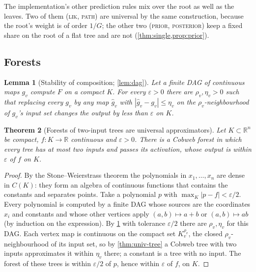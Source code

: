\documentclass[11pt]{article}
\newtheorem{theorem}{Theorem}
\newtheorem{lemma}[theorem]{Lemma}
\theoremstyle{definition}
\theoremstyle{remark}
\newcommand{\R}{\mathbb{R}}
\begin{document}
The implementation's other prediction rules mix over the root as well as the leaves.
Two of them (\textsc{lik}, \textsc{path}) are universal by the same construction, because
the root's weight is of order $1/G$; the other two (\textsc{prior}, \textsc{posterior})
keep a fixed share on the root of a flat tree and are not (\cref{thm:single,prop:prior}).

\subsection{Forests}

\begin{lemma}[Stability of composition; \cref{lem:dag}]\label{lem:stable}
Let a finite DAG of continuous maps $g_v$ compute $F$ on a compact $K$.  For every
$\varepsilon>0$ there are $\rho_v,\eta_v>0$ such that replacing every $g_v$ by any map
$\hat g_v$ with $|\hat g_v-g_v|\le\eta_v$ on the $\rho_v$-neighbourhood of $g_v$'s input set
changes the output by less than $\varepsilon$ on $K$.
\end{lemma}

\begin{theorem}[Forests of two-input trees are universal approximators]\label{thm:univ-forest}
Let $K\subset\R^n$ be compact, $f:K\to\R$ continuous and $\varepsilon>0$.  There is a
Cobweb forest in which every tree has at most two inputs and passes its activation, whose
output is within $\varepsilon$ of $f$ on $K$.
\end{theorem}

\begin{proof}
By the Stone--Weierstrass theorem \citep{stone1948} the polynomials in $x_1,\dots,x_n$
are dense in $C(K)$: they form an algebra of continuous functions that contains the
constants and separates points.  Take a polynomial $p$ with $\max_K|p-f|<\varepsilon/2$.
Every polynomial is computed by a finite DAG whose sources are the coordinates $x_i$ and
constants and whose other vertices apply $(a,b)\mapsto a+b$ or $(a,b)\mapsto ab$ (by
induction on the expression).  By \cref{lem:stable} with tolerance $\varepsilon/2$ there
are $\rho_v,\eta_v$ for this DAG.  Each vertex map is continuous on the compact set
$K_v^{\rho_v}$, the closed $\rho_v$-neighbourhood of its input set, so by
\cref{thm:univ-tree} a Cobweb tree with two inputs approximates it within $\eta_v$ there;
a constant is a tree with no input.  The forest of these trees is within $\varepsilon/2$ of
$p$, hence within $\varepsilon$ of $f$, on $K$.
\end{proof}
\end{document}
